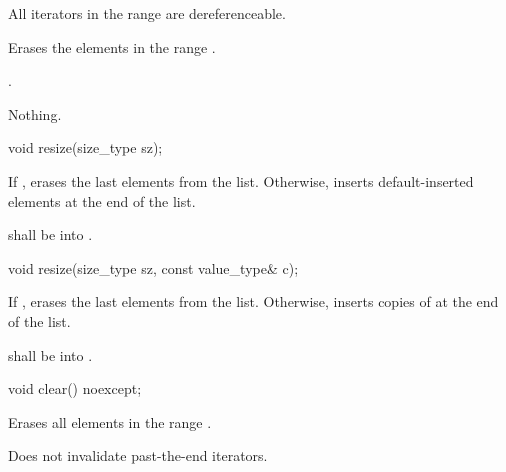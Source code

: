 \begin{itemdescr}
\pnum
\requires All iterators in the range  are dereferenceable.

\pnum
\effects Erases the elements in the range .

\pnum
\returns {}.

\pnum
\throws Nothing.
\end{itemdescr}

%
%
\begin{itemdecl}
void resize(size_type sz);
\end{itemdecl}

\begin{itemdescr}
\pnum
\effects If , erases the last  elements from the list. Otherwise, inserts  default-inserted
elements at the end of the list.

\pnum
\requires {} shall be  into .
\end{itemdescr}

\begin{itemdecl}
void resize(size_type sz, const value_type& c);
\end{itemdecl}

\begin{itemdescr}
\pnum
\effects If , erases the last  elements from the list. Otherwise, inserts   
copies of  at the end of the list.

\pnum
\requires {} shall be  into .
\end{itemdescr}


%
%
\begin{itemdecl}
void clear() noexcept;
\end{itemdecl}

\begin{itemdescr}
\pnum
\effects Erases all elements in the range .

\pnum
\remarks Does not invalidate past-the-end iterators.
\end{itemdescr}

